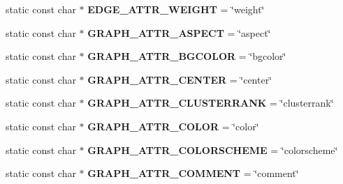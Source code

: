 \begin{DoxyCompactItemize}
\item 
static const char $\ast$ {\bfseries E\+D\+G\+E\+\_\+\+A\+T\+T\+R\+\_\+\+W\+E\+I\+G\+HT} = \char`\"{}weight\char`\"{}\hypertarget{classmemgraph_1_1_graphviz_attrs_aabf08104aa80f4501d3b983721e4b896}{}\label{classmemgraph_1_1_graphviz_attrs_aabf08104aa80f4501d3b983721e4b896}

\item 
static const char $\ast$ {\bfseries G\+R\+A\+P\+H\+\_\+\+A\+T\+T\+R\+\_\+\+A\+S\+P\+E\+CT} = \char`\"{}aspect\char`\"{}\hypertarget{classmemgraph_1_1_graphviz_attrs_a1d8c7103ea4328bf8997e7dfb75bae9e}{}\label{classmemgraph_1_1_graphviz_attrs_a1d8c7103ea4328bf8997e7dfb75bae9e}

\item 
static const char $\ast$ {\bfseries G\+R\+A\+P\+H\+\_\+\+A\+T\+T\+R\+\_\+\+B\+G\+C\+O\+L\+OR} = \char`\"{}bgcolor\char`\"{}\hypertarget{classmemgraph_1_1_graphviz_attrs_a6a6a1690ec751dfe6247fbab6d164919}{}\label{classmemgraph_1_1_graphviz_attrs_a6a6a1690ec751dfe6247fbab6d164919}

\item 
static const char $\ast$ {\bfseries G\+R\+A\+P\+H\+\_\+\+A\+T\+T\+R\+\_\+\+C\+E\+N\+T\+ER} = \char`\"{}center\char`\"{}\hypertarget{classmemgraph_1_1_graphviz_attrs_a2fb3740fd93a8cb27ea711882b0caaf5}{}\label{classmemgraph_1_1_graphviz_attrs_a2fb3740fd93a8cb27ea711882b0caaf5}

\item 
static const char $\ast$ {\bfseries G\+R\+A\+P\+H\+\_\+\+A\+T\+T\+R\+\_\+\+C\+L\+U\+S\+T\+E\+R\+R\+A\+NK} = \char`\"{}clusterrank\char`\"{}\hypertarget{classmemgraph_1_1_graphviz_attrs_af6a3d3769175e1b8ede4b3b46650a1b5}{}\label{classmemgraph_1_1_graphviz_attrs_af6a3d3769175e1b8ede4b3b46650a1b5}

\item 
static const char $\ast$ {\bfseries G\+R\+A\+P\+H\+\_\+\+A\+T\+T\+R\+\_\+\+C\+O\+L\+OR} = \char`\"{}color\char`\"{}\hypertarget{classmemgraph_1_1_graphviz_attrs_a0175bde65b50a6a2e30ffe7d33f075fe}{}\label{classmemgraph_1_1_graphviz_attrs_a0175bde65b50a6a2e30ffe7d33f075fe}

\item 
static const char $\ast$ {\bfseries G\+R\+A\+P\+H\+\_\+\+A\+T\+T\+R\+\_\+\+C\+O\+L\+O\+R\+S\+C\+H\+E\+ME} = \char`\"{}colorscheme\char`\"{}\hypertarget{classmemgraph_1_1_graphviz_attrs_aa8647c41502fb4581dad1a6457e97d8d}{}\label{classmemgraph_1_1_graphviz_attrs_aa8647c41502fb4581dad1a6457e97d8d}

\item 
static const char $\ast$ {\bfseries G\+R\+A\+P\+H\+\_\+\+A\+T\+T\+R\+\_\+\+C\+O\+M\+M\+E\+NT} = \char`\"{}comment\char`\"{}\hypertarget{classmemgraph_1_1_graphviz_attrs_a006d29f25494f9b8b8a009652787d046}{}\label{classmemgraph_1_1_graphviz_attrs_a006d29f25494f9b8b8a009652787d046}


\end{DoxyCompactItemize}
